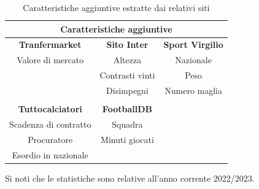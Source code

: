 \begin{table}[h]
    \centering
    \begin{tabular}{|c|c|c|}
        \hline
        \multicolumn{3}{|c|}{Caratteristiche aggiuntive}  \\
        \hline
        \textbf{Tranfermarket} & \textbf{Sito Inter} & \textbf{Sport Virgilio} \\
        \hline
        Valore di mercato & Altezza & Nazionale \\
        \hline
        & Contrasti vinti & Peso \\
        \hline
        & Disimpegni & Numero maglia \\
        \hline
        \multicolumn{3}{|c|}{}\\
        \hline
        \textbf{Tuttocalciatori} & \textbf{FootballDB} & \\
        \hline
        Scadenza di contratto & Squadra & \\
        \hline
        Procuratore & Minuti giocati & \\
        \hline
        Esordio in nazionale &  &\\
        \hline
    \end{tabular}
    \caption{Caratteristiche aggiuntive estratte dai relativi siti}
    \label{tab:my_label}
\end{table}
\newpage
Si noti che le statistiche sono relative all'anno corrente 2022/2023.
